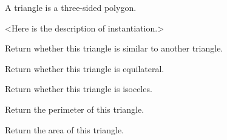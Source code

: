 \documentclass[letterpaper,10pt,english]{sphinxmanual}
\begin{document}
\begin{fulllineitems}
\label{\detokenize{api:trianglelib.shape.Triangle}}
A triangle is a three-sided polygon.

\textless{}Here is the description of instantiation.\textgreater{}

\begin{fulllineitems}
\label{\detokenize{api:trianglelib.shape.Triangle.is_similar}}
Return whether this triangle is similar to another triangle.

\end{fulllineitems}


\begin{fulllineitems}
\label{\detokenize{api:trianglelib.shape.Triangle.is_equilateral}}
Return whether this triangle is equilateral.

\end{fulllineitems}


\begin{fulllineitems}
\label{\detokenize{api:trianglelib.shape.Triangle.is_isosceles}}
Return whether this triangle is isoceles.

\end{fulllineitems}


\begin{fulllineitems}
\label{\detokenize{api:trianglelib.shape.Triangle.perimeter}}
Return the perimeter of this triangle.

\end{fulllineitems}


\begin{fulllineitems}
\label{\detokenize{api:trianglelib.shape.Triangle.area}}
Return the area of this triangle.


\end{fulllineitems}
\end{fulllineitems}
\end{document}
